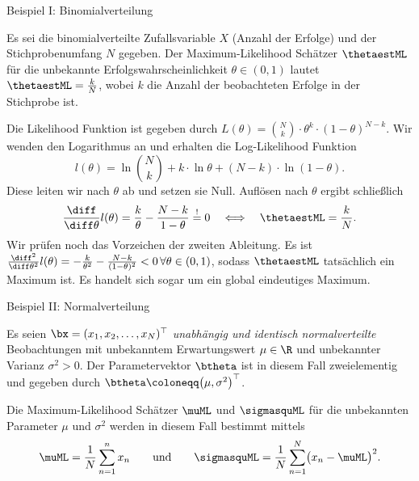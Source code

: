 \begin{frame}{Beispiel I: Binomialverteilung}{}
	\begin{mytheo}
		Es sei die binomialverteilte Zufallsvariable $X$ (Anzahl der Erfolge) und der Stichprobenumfang $N$ gegeben.
		Der Maximum-Likelihood Schätzer $\thetaestML$ für die unbekannte Erfolgswahrscheinlichkeit $\theta \in (0, 1)$ lautet
		$\thetaestML = \frac{k}{N}$, wobei $k$ die Anzahl der beobachteten Erfolge in der Stichprobe ist.
	\end{mytheo}
	
	\begin{myproof}
		Die Likelihood Funktion ist gegeben durch $L(\theta) = {N \choose k} \cdot \theta^k \cdot (1 - \theta)^{N - k}$.
		Wir wenden den Logarithmus an und erhalten die Log-Likelihood Funktion
		\begin{equation*}
			l(\theta) = \ln{N \choose k} + k \cdot \ln \theta + (N - k) \cdot \ln(1 - \theta).
		\end{equation*}
		Diese leiten wir nach $\theta$ ab und setzen sie Null. Auflösen nach $\theta$ ergibt schließlich
		\begin{equation*}
			\frac{\diff}{\diff \theta} l(\theta)
				= \frac{k}{\theta} - \frac{N - k}{1 - \theta}
				\overset{!}{=} 0
		\quad\Longleftrightarrow\quad
			\thetaestML
				= \frac{k}{N}.
		\end{equation*}
		Wir prüfen noch das Vorzeichen der zweiten Ableitung. Es ist
		$\frac{\diff^2}{\diff \theta^2} l(\theta) = -\frac{k}{\theta^2} - \frac{N - k}{(1 - \theta)^2} < 0\,\forall \theta \in (0, 1)$,
		sodass $\thetaestML$ tatsächlich ein Maximum ist. Es handelt sich sogar um ein global eindeutiges Maximum.
	\end{myproof}
\end{frame}


\begin{frame}{Beispiel II: Normalverteilung}{}
	\begin{mytheo}
		Es seien $\bx = (x_1, x_2, \ldots, x_N)^\top$ \textit{unabhängig und identisch normalverteilte} Beobachtungen
		mit unbekanntem Erwartungswert $\mu \in \R$ und unbekannter Varianz $\sigma^2 > 0$.
		Der Parametervektor $\btheta$ ist in diesem Fall zweielementig und gegeben durch
		$\btheta \coloneqq \bigl( \mu, \sigma^2 \bigr)^\top$.
		
		Die Maximum-Likelihood Schätzer $\muML$ und $\sigmasquML$ für die unbekannten Parameter
		$\mu$ und $\sigma^2$ werden in diesem Fall bestimmt mittels
		\begin{equation*}
			\muML
				= \frac{1}{N} \sum_{n=1}^n x_n
		\qquad\text{und}\qquad
			\sigmasquML
				= \frac{1}{N} \sum_{n=1}^N \bigl( x_n - \muML \bigr)^2.
		\end{equation*}
	\end{mytheo}
\end{frame}


